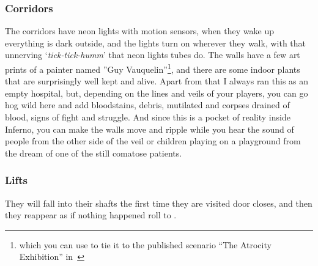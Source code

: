 \documentclass[bg-full]{resources/stylesheets/kult}
\begin{document}

\subsubsection{Corridors}%
\label{ssub:Corridors}
The corridors have neon lights with motion sensors, when they wake up everything is dark outside, and the lights turn on
wherever they walk, with that unnerving ‘\textit{tick-tick-humm}’ that neon lights tubes do.  The walls have a few art prints of
a painter named ”Guy Vauquelin”\footnote{which you can use to tie it to the published scenario “The Atrocity Exhibition”
in~\cite[p.~94]{KULT:taroticum}}, and there are some indoor plants that are surprisingly well kept and alive.  Apart from that
I always ran this as an empty hospital, but, depending on the lines and veils of your players, you can go hog wild here and add
bloodstains, debris, mutilated and corpses drained of blood, signs of fight and struggle.  And since this is a pocket of reality
inside Inferno, you can make the walls move and ripple while you hear the sound of people from the other side of the veil or
children playing on a playground from the dream of one of the still comatose patients.

\subsubsection{Lifts}%
\label{ssub:lifts}

They will fall into their shafts the first time they are visited door closes, and then they reappear as if nothing happened
roll to .
\end{document}
